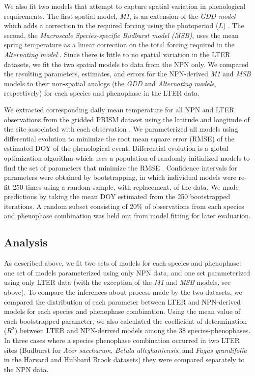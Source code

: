 \documentclass[fleqn,12pt,lineno]{article}
\begin{document}
We also fit two models that attempt to capture spatial variation in phenological requirements. The first spatial model, \textit{M1}, is an extension of the \textit{GDD model} which adds a correction in the required forcing using the photoperiod ($L$) \citep{blumel2012}. The second, the \textit{Macroscale Species-specific Budburst model (MSB)}, uses the mean spring temperature as a linear correction on the total forcing required in the \textit{Alternating model} \citep{jeong2013}. Since there is little to no spatial variation in the LTER datasets, we fit the two spatial models to data from the NPN only. We compared the resulting parameters, estimates, and errors for the NPN-derived \textit{M1} and \textit{MSB} models to their non-spatial analogs (the \textit{GDD} and \textit{Alternating models}, respectively) for each species and phenophase in the LTER data.  

We extracted corresponding daily mean temperature for all NPN and LTER observations from the gridded PRISM dataset using the latitude and longitude of the site associated with each observation \citep{prismdata}. We parameterized all models using differential evolution to minimize the root mean square error (RMSE) of the estimated DOY of the phenological event. Differential evolution is a global optimization algorithm which uses a population of randomly initialized models to find the set of parameters that minimize the RMSE \citep{storn1997}. Confidence intervals for parameters were obtained by bootstrapping, in which individual models were re-fit 250 times using a random sample, with replacement, of the data. We made predictions by taking the mean DOY estimated from the 250 bootstrapped iterations. A random subset consisting of 20\% of observations from each species and phenophase combination was held out from model fitting for later evaluation.

\subsection*{Analysis}

As described above, we fit two sets of models for each species and phenophase: one set of models parameterized using only NPN data, and one set parameterized using only LTER data (with the exception of the \textit{M1} and \textit{MSB} models, see above). To compare the inferences about process made by the two datasets, we compared the distribution of each parameter between LTER and NPN-derived models for each species and phenophase combination. Using the mean value of each bootstrapped parameter, we also calculated the coefficient of determination ($R^2$) between LTER and NPN-derived models among the 38 species-phenophases. In three cases where a species phenophase combination occurred in two LTER sites (Budburst for \textit{Acer saccharum}, \textit{Betula alleghaniensis}, and \textit{Fagus grandifolia} in the Harvard and Hubbard Brook datasets) they were compared separately to the NPN data.
\end{document}
